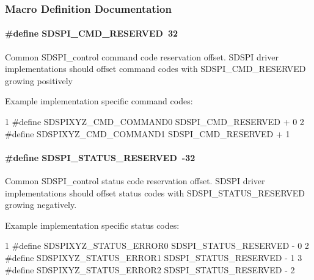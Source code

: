 \subsubsection{Macro Definition Documentation}
\paragraph[{S\+D\+S\+P\+I\+\_\+\+C\+M\+D\+\_\+\+R\+E\+S\+E\+R\+V\+E\+D}]{\setlength{\rightskip}{0pt plus 5cm}\#define S\+D\+S\+P\+I\+\_\+\+C\+M\+D\+\_\+\+R\+E\+S\+E\+R\+V\+E\+D~32}\label{group___s_d_s_p_i___c_o_n_t_r_o_l_ga2912b6627b0f64de874048a5ebea2a85}
Common S\+D\+S\+P\+I\+\_\+control command code reservation offset. S\+D\+S\+P\+I driver implementations should offset command codes with S\+D\+S\+P\+I\+\_\+\+C\+M\+D\+\_\+\+R\+E\+S\+E\+R\+V\+E\+D growing positively

Example implementation specific command codes\+: 
\begin{DoxyCode}
1 #define SDSPIXYZ\_CMD\_COMMAND0    SDSPI\_CMD\_RESERVED + 0
2 #define SDSPIXYZ\_CMD\_COMMAND1    SDSPI\_CMD\_RESERVED + 1
\end{DoxyCode}
\paragraph[{S\+D\+S\+P\+I\+\_\+\+S\+T\+A\+T\+U\+S\+\_\+\+R\+E\+S\+E\+R\+V\+E\+D}]{\setlength{\rightskip}{0pt plus 5cm}\#define S\+D\+S\+P\+I\+\_\+\+S\+T\+A\+T\+U\+S\+\_\+\+R\+E\+S\+E\+R\+V\+E\+D~-\/32}\label{group___s_d_s_p_i___c_o_n_t_r_o_l_ga3037f55e94a7ef536986738c721a690a}
Common S\+D\+S\+P\+I\+\_\+control status code reservation offset. S\+D\+S\+P\+I driver implementations should offset status codes with S\+D\+S\+P\+I\+\_\+\+S\+T\+A\+T\+U\+S\+\_\+\+R\+E\+S\+E\+R\+V\+E\+D growing negatively.

Example implementation specific status codes\+: 
\begin{DoxyCode}
1 #define SDSPIXYZ\_STATUS\_ERROR0   SDSPI\_STATUS\_RESERVED - 0
2 #define SDSPIXYZ\_STATUS\_ERROR1   SDSPI\_STATUS\_RESERVED - 1
3 #define SDSPIXYZ\_STATUS\_ERROR2   SDSPI\_STATUS\_RESERVED - 2
\end{DoxyCode}
 